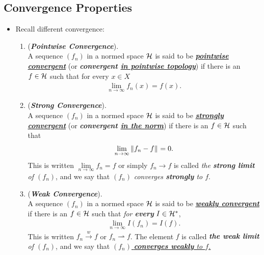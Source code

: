 \documentclass[11pt]{article}
\begin{document}
\subsection{Convergence Properties}
\begin{itemize}
\item 
\begin{remark}
Recall different convergence:
\begin{enumerate}
\item \begin{definition} (\emph{\textbf{Pointwise Convergence}}). \citep{kreyszig1989introductory}\\
A sequence $(f_n)$ in a normed space ${\mathcal H}$ is said to be \underline{\emph{\textbf{pointwise convergent}}} (or \emph{\textbf{convergent \underline{in pointwise topology}}}) if
there is  an $f \in {\mathcal H}$ such that for every $x \in X$
\begin{align*}
\lim\limits_{n\rightarrow \infty} f_n(x) = f(x).
\end{align*}
\end{definition}

\item \begin{definition} (\emph{\textbf{Strong Convergence}}). \citep{kreyszig1989introductory}\\
A sequence $(f_n)$ in a normed space ${\mathcal H}$ is said to be \underline{\emph{\textbf{strongly convergent}}} (or \emph{\textbf{convergent \underline{in the norm}}}) if
there is  an $f \in {\mathcal H}$ such that
\begin{align*}
\lim\limits_{n\rightarrow \infty} \left\|f_n - f\right\|_{} = 0.
\end{align*}
This is written $\lim\limits_{n\rightarrow \infty}f_n = f$ or simply $f_n \rightarrow f$ is called \emph{the \textbf{strong limit} of $(f_n)$}, and we say that $(f_n)$ \emph{converges \textbf{strongly} to $f$}. 
\end{definition}

\item \begin{definition} (\emph{\textbf{Weak Convergence}}). \citep{kreyszig1989introductory}\\
A sequence $(f_n)$ in a normed space ${\mathcal H}$ is said to be \underline{\emph{\textbf{weakly convergent}}} if there is an $f \in {\mathcal H}$ such that \emph{for \textbf{every}} $I \in {\mathcal H}^{*}$,
\begin{align*}
\lim\limits_{n\rightarrow \infty} I(f_n) = I(f).
\end{align*}
This is written $f_n \stackrel{w}{\rightarrow} f$ or $f_n \rightharpoonup f$. The element $f$ is called \emph{\textbf{the weak limit} of $(f_n)$}, and we say
that \underline{$(f_n)$ \emph{\textbf{converges weakly} to $f$.}}
\end{definition}
\end{enumerate}
\end{remark}



\end{itemize}
\end{document}
